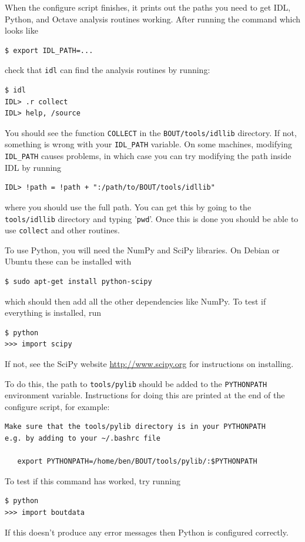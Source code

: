 \documentclass[12pt]{article}
\begin{document}
When the configure script finishes, it prints out the paths you need to get
IDL, Python, and Octave analysis routines working. After running the  command
which looks like
%
\begin{verbatim}
$ export IDL_PATH=...
\end{verbatim}
%
check that \texttt{idl} can find the analysis routines by running:
%
\begin{verbatim}
$ idl
IDL> .r collect
IDL> help, /source
\end{verbatim}
%
You should see the function \texttt{COLLECT} in the \texttt{BOUT/tools/idllib}
directory. If not, something is wrong with your \texttt{IDL\_PATH} variable. On
some machines, modifying \texttt{IDL\_PATH} causes problems, in which case you
can try modifying the path inside IDL by running
%
\begin{verbatim}
IDL> !path = !path + ":/path/to/BOUT/tools/idllib"
\end{verbatim}
%
where you should use the full path. You can get this by going to the
\texttt{tools/idllib} directory and typing '\texttt{pwd}'. Once this is done
you should be able to use \texttt{collect} and other routines.


To use Python, you will need the NumPy and SciPy libraries. On Debian or Ubuntu
these can be installed with
%
\begin{verbatim}
$ sudo apt-get install python-scipy
\end{verbatim}
%
which should then add all the other dependencies like NumPy. To test if
everything is installed, run
%
\begin{verbatim}
$ python
>>> import scipy
\end{verbatim}
%
If not, see the SciPy website \url{http://www.scipy.org} for instructions on
installing.

To do this, the path to \texttt{tools/pylib} should be added to the
\texttt{PYTHONPATH} environment variable.  Instructions for doing this are
printed at the end of the configure script, for example:

%
\begin{verbatim}
Make sure that the tools/pylib directory is in your PYTHONPATH
e.g. by adding to your ~/.bashrc file

   export PYTHONPATH=/home/ben/BOUT/tools/pylib/:$PYTHONPATH

\end{verbatim}
%
To test if this command has worked, try running
%
\begin{verbatim}
$ python
>>> import boutdata
\end{verbatim}
%
If this doesn't produce any error messages then Python is configured correctly.
\end{document}
